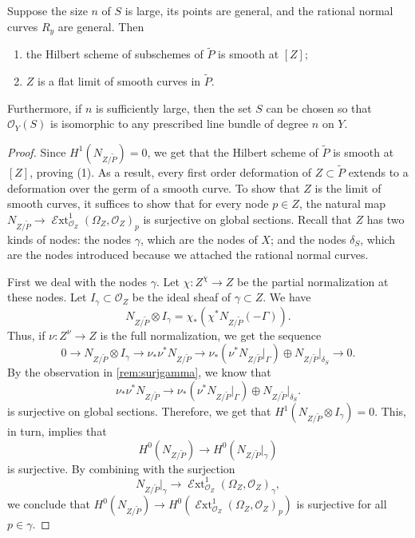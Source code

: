 \documentclass[11 pt]{amsart}
\renewcommand{\O}{{\mathcal O}}
\DeclareMathOperator{\shExt}{\mathscr{E}xt}
\providecommand {\from}{{\colon}}
\numberwithin{equation}{section}
\begin{document}
\begin{proposition}
  \label{prop:key_singular}
  Suppose the size $n$ of $S$ is large, its points are general, and the rational normal curves $R_y$ are general.
  Then
  \begin{enumerate}
  \item the Hilbert scheme of subschemes of $\widetilde{P}$ is smooth at $[Z]$;
  \item $Z$ is a flat limit of smooth curves in $\widetilde{P}$.
  \end{enumerate}
  Furthermore, if $n$ is sufficiently large, then the set $S$ can be chosen so that $\O_Y(S)$ is  isomorphic to any prescribed line bundle of degree $n$ on $Y$.
\end{proposition}
\begin{proof}
  Since $H^1(N_{Z/\widetilde{P}}) = 0$, we get that the Hilbert scheme of $\widetilde{P}$ is smooth at $[Z]$, proving (1).
  As a result, every first order deformation of $Z \subset \widetilde{P}$ extends to a deformation over the germ of a smooth curve.
  To show that $Z$ is the limit of smooth curves, it suffices to show that for every node $p \in Z$, the natural map $N_{Z/\widetilde{P}} \to \shExt^1_{\O_Z}(\Omega_Z, \O_Z)_p$ is surjective on global sections.
  Recall that $Z$ has two kinds of nodes: the nodes $\gamma$, which are the nodes of $X$; and the nodes $\delta_S$, which are the nodes introduced because we attached the rational normal curves.

  First we deal with the nodes $\gamma$.
  Let $\chi \from Z^\chi \to Z$ be the partial normalization at these nodes.
  Let $I_\gamma \subset \O_Z$ be the ideal sheaf of $\gamma \subset Z$.
  We have 
  \[ N_{Z/\widetilde{P}} \otimes I_{\gamma} = \chi_* \left( \chi^*N_{Z/\widetilde{P}}(-\Gamma) \right).\]
  Thus, if $\nu \from Z^\nu \to Z$ is the full normalization, we get the sequence
  \[ 0 \to N_{Z/\widetilde{P}} \otimes I_\gamma \to \nu_*\nu^* N_{Z/\widetilde{P}} \to \nu_* \left(\nu^*N_{Z/\widetilde{P}}\big|_\Gamma\right) \oplus N_{Z/\widetilde{P}}\big |_{\delta_S} \to 0.\]
  By the observation in \autoref{rem:surjgamma}, we know that 
  \[ \nu_*\nu^* N_{Z/\widetilde{P}} \to \nu_* \left(\nu^*N_{Z/\widetilde{P}}\big|_\Gamma\right) \oplus N_{Z/\widetilde{P}}\big |_{\delta_S}.\]
  is surjective on global sections.
  Therefore, we get that $H^1(N_{Z/\widetilde{P}} \otimes I_\gamma) = 0$.
  This, in turn, implies that
  \[H^0(N_{Z/\widetilde{P}}) \to H^0(N_{Z/\widetilde{P}}|_\gamma)\]
  is surjective.
  By combining with the surjection
  \[ N_{Z/\widetilde{P}}\big|_\gamma \to \shExt^1_{\O_Z}(\Omega_Z, \O_Z)_{\gamma},\]
  we conclude that $H^0(N_{Z/\widetilde{P}}) \to H^0(\shExt^1_{\O_Z}(\Omega_Z, \O_Z)_p)$ is surjective for all $p \in \gamma$.
  

\end{proof}
\end{document}
